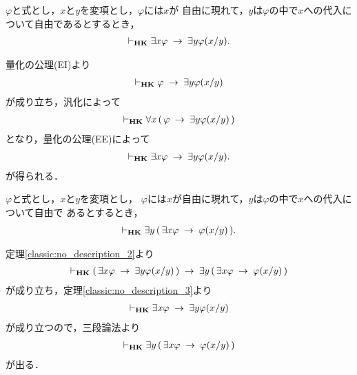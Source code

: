 	\begin{screen}
		\begin{thm}\label{classic:no_description_3}
			$\varphi$と式とし，$x$と$y$を変項とし，$\varphi$には$x$が
			自由に現れて，$y$は$\varphi$の中で$x$への代入について自由であるとするとき，
			\begin{align}
				\vdash_{{\scriptsize \mbox{{\bf HK}}}} \exists x \varphi \hspace{0.25em}\rightarrow\hspace{0.25em} \exists y \varphi(x/y).
			\end{align}
		\end{thm}
	\end{screen}
	
	\begin{sketch}
		量化の公理(EI)より
		\begin{align}
			\vdash_{{\scriptsize \mbox{{\bf HK}}}} \varphi \hspace{0.25em}\rightarrow\hspace{0.25em} \exists y \varphi(x/y)
		\end{align}
		が成り立ち，汎化によって
		\begin{align}
			\vdash_{{\scriptsize \mbox{{\bf HK}}}} \forall x\, (\, \varphi \hspace{0.25em}\rightarrow\hspace{0.25em} \exists y \varphi(x/y)\, )
		\end{align}
		となり，量化の公理(EE)によって
		\begin{align}
			\vdash_{{\scriptsize \mbox{{\bf HK}}}} \exists x \varphi \hspace{0.25em}\rightarrow\hspace{0.25em} \exists y \varphi(x/y).
		\end{align}
		が得られる．
		\QED
	\end{sketch}
	
	\begin{screen}
		\begin{thm}\label{classic:lemma_for_Henkin_expansion}
			$\varphi$と式とし，$x$と$y$を変項とし，
			$\varphi$には$x$が自由に現れて，$y$は$\varphi$の中で$x$への代入について自由で
			あるとするとき，
			\begin{align}
				\vdash_{{\scriptsize \mbox{{\bf HK}}}} \exists y\, (\, \exists x \varphi \hspace{0.25em}\rightarrow\hspace{0.25em} \varphi(x/y)\, ).
			\end{align}
		\end{thm}
	\end{screen}
	
	\begin{sketch}
		定理\ref{classic:no_description_2}より
		\begin{align}
			\vdash_{{\scriptsize \mbox{{\bf HK}}}} 
			(\, \exists x \varphi \hspace{0.25em}\rightarrow\hspace{0.25em} \exists y \varphi(x/y)\, )
			\hspace{0.25em}\rightarrow\hspace{0.25em} \exists y\, (\, \exists x \varphi \hspace{0.25em}\rightarrow\hspace{0.25em} \varphi(x/y)\, )
		\end{align}
		が成り立ち，定理\ref{classic:no_description_3}より
		\begin{align}
			\vdash_{{\scriptsize \mbox{{\bf HK}}}} 
			\exists x \varphi \hspace{0.25em}\rightarrow\hspace{0.25em} \exists y \varphi(x/y)
		\end{align}
		が成り立つので，三段論法より
		\begin{align}
			\vdash_{{\scriptsize \mbox{{\bf HK}}}} \exists y\, (\, \exists x \varphi \hspace{0.25em}\rightarrow\hspace{0.25em} \varphi(x/y)\, )
		\end{align}
		が出る．
	\end{sketch}